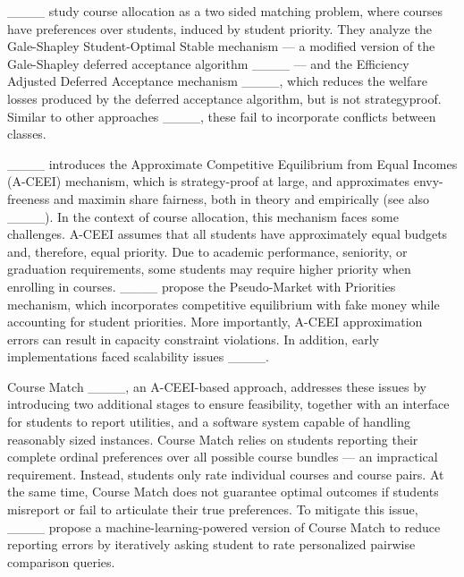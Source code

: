 ____ study course allocation as a two sided matching problem, where courses have preferences over students, induced by student priority. 
They analyze the Gale-Shapley Student-Optimal Stable mechanism --- a modified version of the Gale-Shapley deferred acceptance algorithm ____ --- and the Efficiency Adjusted Deferred Acceptance mechanism ____, which reduces the welfare losses produced by the deferred acceptance algorithm, but is not strategyproof. 
Similar to other approaches ____, these fail to incorporate conflicts between classes. %

____ introduces the Approximate Competitive Equilibrium from Equal Incomes (A-CEEI) mechanism, which is strategy-proof at large, and approximates envy-freeness and maximin share fairness, both in theory and empirically (see also ____). 
In the context of course allocation, this mechanism faces some challenges. 
A-CEEI assumes that all students have approximately equal budgets and, therefore, equal priority. Due to academic performance, seniority, or graduation requirements, some students may require higher priority when enrolling in courses. ____ propose the Pseudo-Market with Priorities mechanism, which incorporates competitive equilibrium with fake money while accounting for student priorities. 
More importantly, A-CEEI approximation errors can result in capacity constraint violations. In addition, early implementations faced scalability issues ____.

Course Match ____, an A-CEEI-based approach, addresses these issues by introducing two additional stages to ensure feasibility, together with an interface for students to report utilities, and a software system capable of handling reasonably sized instances. 
Course Match relies on students reporting their complete ordinal preferences over all possible course bundles --- an impractical requirement. Instead, students only rate individual courses and course pairs. 
At the same time, Course Match does not guarantee optimal outcomes if students misreport or fail to articulate their true preferences. To mitigate this issue, ____ propose a machine-learning-powered version of Course Match to reduce reporting errors by iteratively asking student to rate personalized pairwise comparison queries. 

